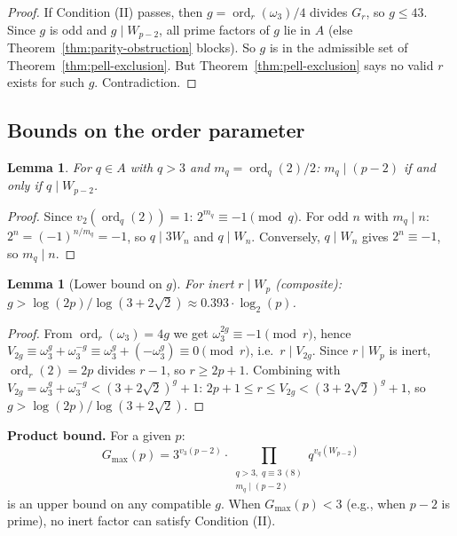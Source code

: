 \documentclass[12pt]{article}
\theoremstyle{plain}
\newtheorem{lemma}[theorem]{Lemma}
\theoremstyle{definition}
\theoremstyle{remark}
\begin{document}
\begin{proof}
If Condition (II) passes, then
\(g = \operatorname{ord}_r(\omega_3)/4\) divides \(G_r\), so
\(g \leq 43\). Since \(g\) is odd and \(g \mid W_{p-2}\), all prime
factors of \(g\) lie in \(A\) (else Theorem~\ref{thm:parity-obstruction} blocks). So \(g\) is
in the admissible set of Theorem~\ref{thm:pell-exclusion}. But Theorem~\ref{thm:pell-exclusion} says no valid
\(r\) exists for such \(g\). Contradiction.\end{proof}


\subsection{Bounds on the order parameter}


\begin{lemma}\label{lem:class-III-div}
For \(q \in A\) with \(q > 3\) and \(m_q =
\operatorname{ord}_q(2)/2\): \(m_q \mid (p-2)\) if and only if
\(q \mid W_{p-2}\).
\end{lemma}


\begin{proof}
Since \(v_2(\operatorname{ord}_q(2)) = 1\):
\(2^{m_q} \equiv -1 \pmod{q}\). For odd \(n\) with \(m_q \mid n\):
\(2^n = (-1)^{n/m_q} = -1\), so \(q \mid 3W_n\) and \(q \mid W_n\).
Conversely, \(q \mid W_n\) gives \(2^n \equiv -1\), so
\(m_q \mid n\).\end{proof}


\begin{lemma}[Lower bound on $g$]\label{lem:lower-bound-g}
For inert \(r \mid W_p\) (composite):
\(g > \log(2p)/\log(3+2\sqrt{2}) \approx 0.393 \cdot \log_2(p)\).
\end{lemma}

\begin{proof}
From \(\operatorname{ord}_r(\omega_3) = 4g\) we get
\(\omega_3^{2g} \equiv -1 \pmod r\), hence
\(V_{2g} \equiv \omega_3^g + \omega_3^{-g} \equiv \omega_3^g +
(-\omega_3^g) \equiv 0 \pmod r\), i.e.\ \(r \mid V_{2g}\).
Since \(r \mid W_p\) is inert, \(\operatorname{ord}_r(2) = 2p\)
divides \(r-1\), so \(r \geq 2p+1\). Combining with
\(V_{2g} = \omega_3^g + \omega_3^{-g} < (3+2\sqrt{2})^g + 1\):
\(2p+1 \leq r \leq V_{2g} < (3+2\sqrt{2})^g + 1\), so
\(g > \log(2p)/\log(3+2\sqrt{2})\).
\end{proof}


\textbf{Product bound.} For a given \(p\):
\[
G_{\max}(p) = 3^{v_3(p-2)} \cdot \prod_{\substack{q > 3,\; q \equiv 3\,(8) \\
m_q \mid (p-2)}} q^{v_q(W_{p-2})}
\]
is an upper bound on any compatible \(g\). When
\(G_{\max}(p) < 3\) (e.g., when \(p - 2\) is prime), no inert
factor can satisfy Condition (II).
\end{document}
